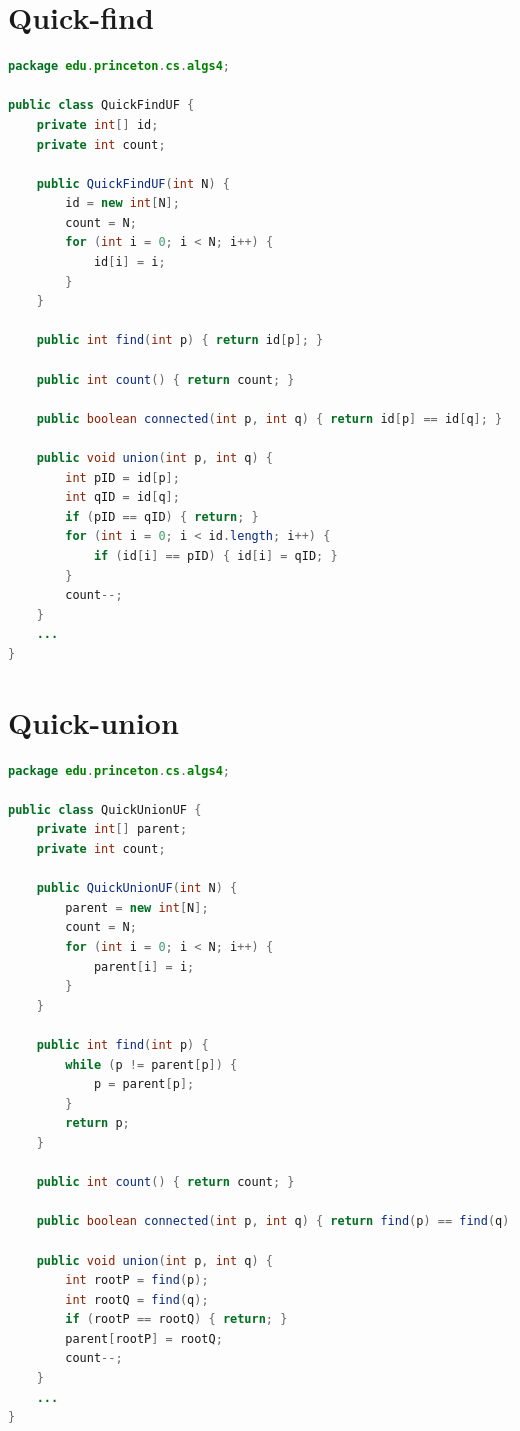 \documentclass[8pt,a4paper,compress]{beamer}
\begin{document}
\section{Quick-find}
\begin{frame}[fragile]
\begin{lstlisting}[language=Java]
package edu.princeton.cs.algs4;

public class QuickFindUF {
    private int[] id;
    private int count;

    public QuickFindUF(int N) {
        id = new int[N];
        count = N;
        for (int i = 0; i < N; i++) {
            id[i] = i;
        }
    }

    public int find(int p) { return id[p]; }

    public int count() { return count; }
  
    public boolean connected(int p, int q) { return id[p] == id[q]; }

    public void union(int p, int q) {
        int pID = id[p];
        int qID = id[q];
        if (pID == qID) { return; }
        for (int i = 0; i < id.length; i++) {
            if (id[i] == pID) { id[i] = qID; }
        }
        count--;
    }
    ...
}
\end{lstlisting}
\end{frame}

\section{Quick-union}
\begin{frame}[fragile]
\begin{lstlisting}[language=Java]
package edu.princeton.cs.algs4;

public class QuickUnionUF {
    private int[] parent;
    private int count;

    public QuickUnionUF(int N) {
        parent = new int[N];
        count = N;
        for (int i = 0; i < N; i++) {
            parent[i] = i;
        }
    }

    public int find(int p) {
        while (p != parent[p]) { 
            p = parent[p]; 
        }
        return p;
    }

    public int count() { return count; }
  
    public boolean connected(int p, int q) { return find(p) == find(q); }

    public void union(int p, int q) {
        int rootP = find(p);
        int rootQ = find(q);
        if (rootP == rootQ) { return; }
        parent[rootP] = rootQ; 
        count--;
    }
    ...
}
\end{lstlisting}
\end{frame}
\end{document}
